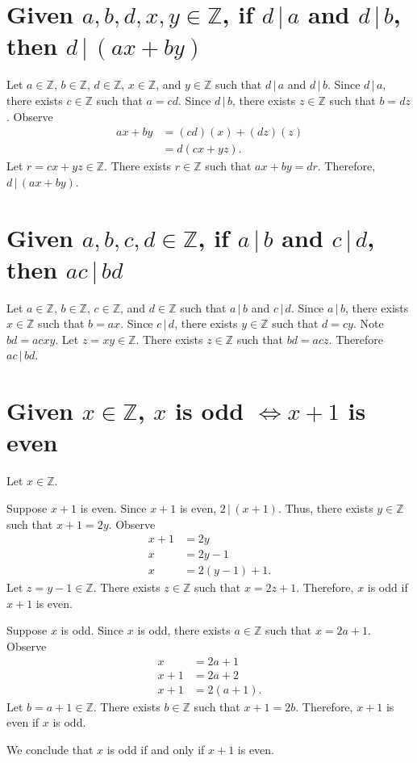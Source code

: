 \documentclass[12pt]{article}
\begin{document}
\section{Given $a,b,d,x,y\in\mathbb{Z}$, if $d\,|\,a$ and $d\,|\,b$, then $d\,|\,(ax+by)$}
Let $a\in\mathbb{Z}$, $b\in\mathbb{Z}$, $d\in\mathbb{Z}$, $x\in\mathbb{Z}$, and $y\in\mathbb{Z}$ such that $d\,|\,a$ and $d\,|\,b$. Since $d\,|\,a$, there exists $c\in\mathbb{Z}$ such that $a=cd$. Since $d\,|\,b$, there exists $z\in\mathbb{Z}$ such that $b=dz$. Observe
\begin{align*}
ax+by
&=(cd)(x)+(dz)(z)\\
&=d(cx+yz).
\end{align*}
Let $r=cx+yz\in\mathbb{Z}$. There exists $r\in\mathbb{Z}$ such that $ax+by=dr$. Therefore, $d\,|\,(ax+by)$.
\section{Given $a,b,c,d\in\mathbb{Z}$, if $a\,|\,b$ and $c\,|\,d$, then $ac\,|\,bd$}
Let $a\in\mathbb{Z}$, $b\in\mathbb{Z}$, $c\in\mathbb{Z}$, and $d\in\mathbb{Z}$ such that $a\,|\,b$ and $c\,|\,d$. Since $a\,|\,b$, there exists $x\in\mathbb{Z}$ such that $b=ax$. Since $c\,|\,d$, there exists $y\in\mathbb{Z}$ such that $d=cy$. Note $bd=acxy$. Let $z=xy\in\mathbb{Z}$. There exists $z\in\mathbb{Z}$ such that $bd=acz$. Therefore $ac\,|\,bd$.
\section{Given $x\in\mathbb{Z}$, $x$ is odd $\iff x+1$ is even}
Let $x\in\mathbb{Z}$.

Suppose $x+1$ is even. Since $x+1$ is even, $2\,|\,(x+1)$. Thus, there exists $y\in\mathbb{Z}$ such that $x+1=2y$. Observe
\begin{align*}
x+1&=2y\\
x&=2y-1\\
x&=2(y-1)+1.
\end{align*}
Let $z=y-1\in\mathbb{Z}$. There exists $z\in\mathbb{Z}$ such that $x=2z+1$. Therefore, $x$ is odd if $x+1$ is even.

Suppose $x$ is odd. Since $x$ is odd, there exists $a\in\mathbb{Z}$ such that $x=2a+1$. Observe
\begin{align*}
x&=2a+1\\
x+1&=2a+2\\
x+1&=2(a+1).
\end{align*}
Let $b=a+1\in\mathbb{Z}$. There exists $b\in\mathbb{Z}$ such that $x+1=2b$. Therefore, $x+1$ is even if $x$ is odd.

We conclude that $x$ is odd if and only if $x+1$ is even.
\end{document}
